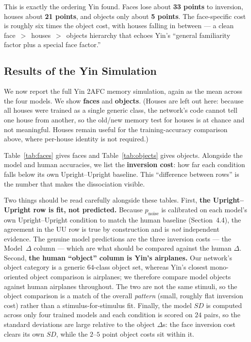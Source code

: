 \documentclass[11pt]{article}
\begin{document}
This is exactly the ordering Yin found. Faces lose about \textbf{33 points} to inversion,
houses about \textbf{21 points}, and objects only about \textbf{5 points}. The face-specific
cost is roughly six times the object cost, with houses falling in between --- a clean
face~$>$~houses~$>$~objects hierarchy that echoes Yin's ``general familiarity factor plus a
special face factor.''

\subsection{Results of the Yin Simulation}

We now report the full Yin 2AFC memory simulation, again as the mean across the four models.
We show \textbf{faces} and \textbf{objects}. (Houses are left out here: because all houses
were trained as a single generic class, the network's code cannot tell one house from
another, so the old/new memory test for houses is at chance and not meaningful. Houses remain
useful for the training-accuracy comparison above, where per-house identity is not required.)

Table~\ref{tab:faces} gives faces and Table~\ref{tab:objects} gives objects. Alongside the
model and human accuracies, we list the \textbf{inversion cost}: how far each condition falls
below its own Upright--Upright baseline. This ``difference between rows'' is the number that
makes the dissociation visible.

Two things should be read carefully alongside these tables. First, \textbf{the Upright--Upright
row is fit, not predicted.} Because $p_{\text{noise}}$ is calibrated on each model's own
Upright--Upright condition to match the human baseline (Section~4.4), the agreement in the UU
row is true by construction and is \emph{not} independent evidence. The genuine model predictions
are the three inversion costs --- the Model~$\Delta$ column --- which are what should be compared
against the human $\Delta$. Second, \textbf{the human ``object'' column is Yin's airplanes.} Our
network's object category is a generic $64$-class object set, whereas Yin's closest mono-oriented
object comparison is airplanes; we therefore compare model objects against human airplanes
throughout. The two are not the same stimuli, so the object comparison is a match of the overall
\emph{pattern} (small, roughly flat inversion cost) rather than a stimulus-for-stimulus fit.
Finally, the model $SD$ is computed across only four trained models and each condition is scored
on $24$ pairs, so the standard deviations are large relative to the object $\Delta$s: the face
inversion cost clears its own $SD$, while the $2$--$5$ point object costs sit within it.
\end{document}
